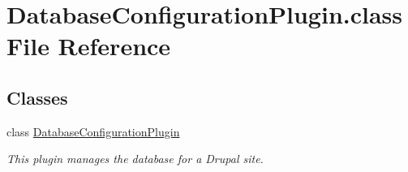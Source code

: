 \hypertarget{DatabaseConfigurationPlugin_8class}{\section{Database\-Configuration\-Plugin.\-class File Reference}
\label{DatabaseConfigurationPlugin_8class}
}
\subsection*{Classes}
\begin{DoxyCompactItemize}
\item 
class \hyperlink{classDatabaseConfigurationPlugin}{Database\-Configuration\-Plugin}
\begin{DoxyCompactList}\small\item\em This plugin manages the database for a Drupal site. \end{DoxyCompactList}\end{DoxyCompactItemize}
